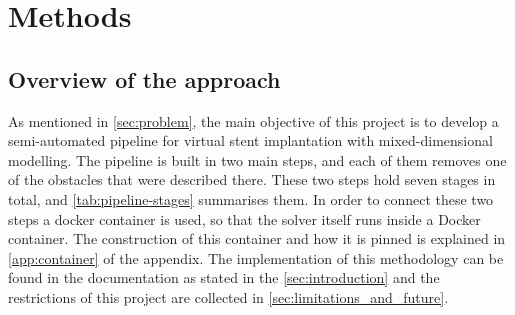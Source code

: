 \section{Methods}
\label{sec:methods}

\subsection{Overview of the approach}
\label{sec:approach-overview}

As mentioned in \cref{sec:problem}, the main objective of this project is to develop a semi-automated pipeline for virtual stent implantation with mixed-dimensional modelling. The pipeline is built in two main steps, and each of them removes one of the obstacles that were described there. These two steps hold seven stages in total, and \cref{tab:pipeline-stages} summarises them. In order to connect these two steps a docker container is used, so that the solver itself runs inside a Docker container. The construction of this container and how it is pinned is explained in \cref{app:container} of the appendix. The implementation of this methodology can be found in the documentation as stated in the \cref{sec:introduction} and the restrictions of this project are collected in \cref{sec:limitations_and_future}.

\begin{table}[htb]
  \centering
  \footnotesize
  \setlength{\tabcolsep}{4pt}
  \caption{The seven stages of the pipeline, grouped into the two main steps.}
  \label{tab:pipeline-stages}
\end{table}

